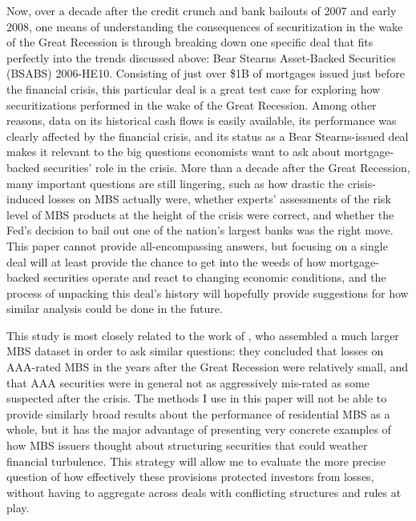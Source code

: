 \documentclass[12pt]{article}
\begin{document}
Now, over a decade after the credit crunch and bank bailouts of 2007 and early 2008, one means of understanding the consequences of securitization in the wake of the Great Recession is through breaking down one specific deal that fits perfectly into the trends discussed above: Bear Stearns Asset-Backed Securities (BSABS) 2006-HE10. Consisting of just over \$1B of mortgages issued just before the financial crisis, this particular deal is a great test case for exploring how securitizations performed in the wake of the Great Recession. Among other reasons, data on its historical cash flows is easily available, its performance was clearly affected by the financial crisis, and its status as a Bear Stearns-issued deal makes it relevant to the big questions economists want to ask about mortgage-backed securities’ role in the crisis. More than a decade after the Great Recession, many important questions are still lingering, such as how drastic the crisis-induced losses on MBS actually were, whether experts’ assessments of the risk level of MBS products at the height of the crisis were correct, and whether the Fed’s decision to bail out one of the nation’s largest banks was the right move. This paper cannot provide all-encompassing answers, but focusing on a single deal will at least provide the chance to get into the weeds of how mortgage-backed securities operate and react to changing economic conditions, and the process of unpacking this deal's history will hopefully provide suggestions for how similar analysis could be done in the future.

This study is most closely related to the work of \textcite{ospina18}, who assembled a much larger MBS dataset in order to ask similar questions: they concluded that losses on AAA-rated MBS in the years after the Great Recession were relatively small, and that AAA securities were in general not as aggressively mis-rated as some suspected after the crisis. The methods I use in this paper will not be able to provide similarly broad results about the performance of residential MBS as a whole, but it has the major advantage of presenting very concrete examples of how MBS issuers thought about structuring securities that could weather financial turbulence. This strategy will allow me to evaluate the more precise question of how effectively these provisions protected investors from losses, without having to aggregate across deals with conflicting structures and rules at play.
\end{document}
